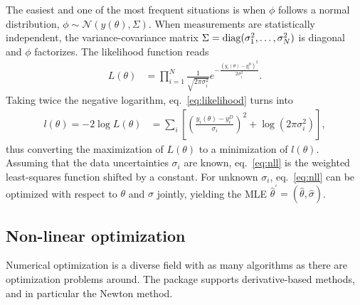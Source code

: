 \documentclass[article]{jss}
\begin{document}
The easiest and one of the most frequent situations is when $\phi$ follows a normal distribution, $\phi\sim\mathcal N(y(\theta), \Sigma)$. When measurements are statistically independent, the variance-covariance matrix $\Sigma = {\rm diag}(\sigma_1^2, \dots, \sigma_N^2)$ is diagonal and $\phi$ factorizes. The likelihood function reads 
\begin{align}
	L(\theta) &= \prod_{i = 1}^N \frac{1}{\sqrt{2\pi\sigma_i^2}} e^{-\frac{(y_i(\theta)-y_i^D)^2}{2\sigma_i^2}} .
	\label{eq:likelihood}
\end{align}
Taking twice the negative logarithm, eq.~\eqref{eq:likelihood} turns into
\begin{align}
	l(\theta) = -2\log L(\theta) &= \sum_i \left[\left(\frac{y_i(\theta) - y_i^D}{\sigma_i}\right)^2 + \log(2\pi\sigma_i^2)\right],
	\label{eq:nll}
\end{align}
thus converting the maximization of $L(\theta)$ to a minimization of $l(\theta)$.
Assuming that the data uncertainties $\sigma_i$ are known, eq.~\eqref{eq:nll} is the weighted least-squares function shifted by a constant. For unknown $\sigma_i$, eq.~\eqref{eq:nll} can be optimized with respect to $\theta$ and $\sigma$ jointly, yielding the MLE $\hat\theta^{\prime} = (\hat\theta, \hat\sigma)$.

\subsection{Non-linear optimization}

Numerical optimization is a diverse field with as many algorithms as there are optimization problems around. The  package supports derivative-based methods, and in particular the Newton method.
\end{document}
